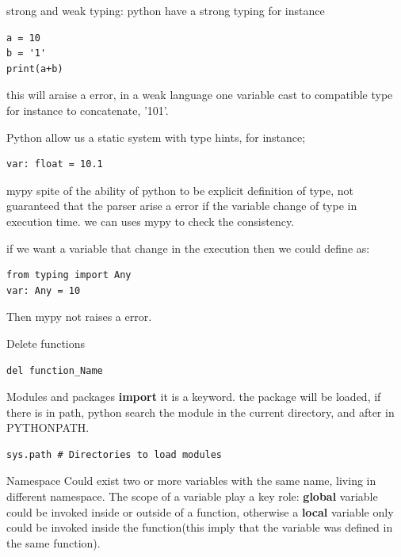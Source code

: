 \documentclass{beamer}
\begin{document}
\begin{frame}[fragile]
strong and weak typing:
python have a strong typing for instance
\begin{lstlisting}
a = 10
b = '1'
print(a+b)
\end{lstlisting}
this will araise a error, in a weak language one variable cast to compatible type for instance to concatenate, '101'.

Python allow us a static system with type hints, for instance;
\begin{lstlisting}
var: float = 10.1
\end{lstlisting}
\end{frame}


\begin{frame}[fragile]{mypy}
spite of the ability of python to be explicit definition of type, not guaranteed that the parser arise a error if the variable change of type in execution time.
we can uses mypy to check the consistency.

if we want a variable that change in the execution then we could define as:
\begin{lstlisting}
from typing import Any
var: Any = 10
\end{lstlisting}
Then mypy not raises a error.
\end{frame}

\begin{frame}[fragile]{Delete functions}
\begin{lstlisting}
del function_Name
\end{lstlisting}
\end{frame}


\begin{frame}[fragile]{Modules and packages}
\textbf{import} it is a keyword.
the package will be loaded, if there is in path, python search the module in the current directory, and after in PYTHONPATH.

\begin{lstlisting}
sys.path # Directories to load modules

\end{lstlisting}
\end{frame}



\begin{frame}[fragile]{Namespace}
Could exist two or more variables with the same name, living in different namespace. The scope of a variable play a key role: \textbf{global} variable could be invoked inside or outside of a function, otherwise a \textbf{local} variable only could be invoked inside the function(this imply that the variable was defined in the same function).
\end{frame}
\end{document}
